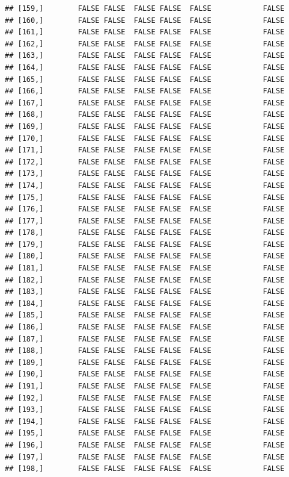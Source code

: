 \documentclass[
  english,
  man,floatsintext]{apa6}
\begin{document}
\begin{verbatim}
## [159,]        FALSE FALSE  FALSE FALSE  FALSE            FALSE
## [160,]        FALSE FALSE  FALSE FALSE  FALSE            FALSE
## [161,]        FALSE FALSE  FALSE FALSE  FALSE            FALSE
## [162,]        FALSE FALSE  FALSE FALSE  FALSE            FALSE
## [163,]        FALSE FALSE  FALSE FALSE  FALSE            FALSE
## [164,]        FALSE FALSE  FALSE FALSE  FALSE            FALSE
## [165,]        FALSE FALSE  FALSE FALSE  FALSE            FALSE
## [166,]        FALSE FALSE  FALSE FALSE  FALSE            FALSE
## [167,]        FALSE FALSE  FALSE FALSE  FALSE            FALSE
## [168,]        FALSE FALSE  FALSE FALSE  FALSE            FALSE
## [169,]        FALSE FALSE  FALSE FALSE  FALSE            FALSE
## [170,]        FALSE FALSE  FALSE FALSE  FALSE            FALSE
## [171,]        FALSE FALSE  FALSE FALSE  FALSE            FALSE
## [172,]        FALSE FALSE  FALSE FALSE  FALSE            FALSE
## [173,]        FALSE FALSE  FALSE FALSE  FALSE            FALSE
## [174,]        FALSE FALSE  FALSE FALSE  FALSE            FALSE
## [175,]        FALSE FALSE  FALSE FALSE  FALSE            FALSE
## [176,]        FALSE FALSE  FALSE FALSE  FALSE            FALSE
## [177,]        FALSE FALSE  FALSE FALSE  FALSE            FALSE
## [178,]        FALSE FALSE  FALSE FALSE  FALSE            FALSE
## [179,]        FALSE FALSE  FALSE FALSE  FALSE            FALSE
## [180,]        FALSE FALSE  FALSE FALSE  FALSE            FALSE
## [181,]        FALSE FALSE  FALSE FALSE  FALSE            FALSE
## [182,]        FALSE FALSE  FALSE FALSE  FALSE            FALSE
## [183,]        FALSE FALSE  FALSE FALSE  FALSE            FALSE
## [184,]        FALSE FALSE  FALSE FALSE  FALSE            FALSE
## [185,]        FALSE FALSE  FALSE FALSE  FALSE            FALSE
## [186,]        FALSE FALSE  FALSE FALSE  FALSE            FALSE
## [187,]        FALSE FALSE  FALSE FALSE  FALSE            FALSE
## [188,]        FALSE FALSE  FALSE FALSE  FALSE            FALSE
## [189,]        FALSE FALSE  FALSE FALSE  FALSE            FALSE
## [190,]        FALSE FALSE  FALSE FALSE  FALSE            FALSE
## [191,]        FALSE FALSE  FALSE FALSE  FALSE            FALSE
## [192,]        FALSE FALSE  FALSE FALSE  FALSE            FALSE
## [193,]        FALSE FALSE  FALSE FALSE  FALSE            FALSE
## [194,]        FALSE FALSE  FALSE FALSE  FALSE            FALSE
## [195,]        FALSE FALSE  FALSE FALSE  FALSE            FALSE
## [196,]        FALSE FALSE  FALSE FALSE  FALSE            FALSE
## [197,]        FALSE FALSE  FALSE FALSE  FALSE            FALSE
## [198,]        FALSE FALSE  FALSE FALSE  FALSE            FALSE

\end{verbatim}
\end{document}
